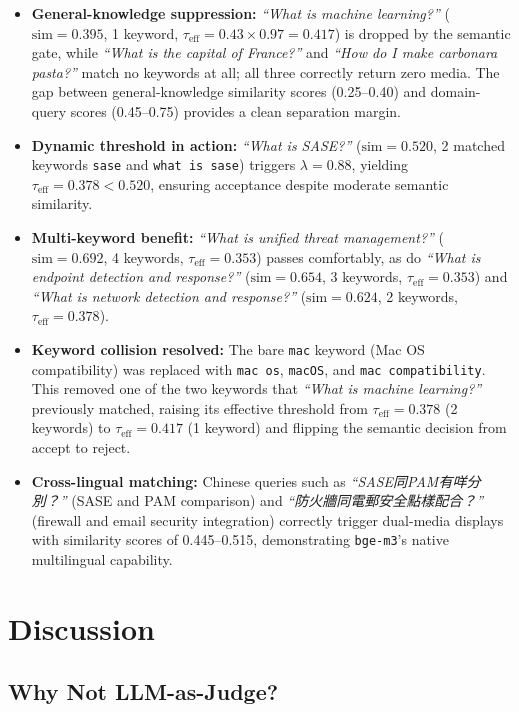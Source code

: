 \documentclass{article}
\begin{document}
\begin{itemize}
  \item \textbf{General-knowledge suppression:} \textit{``What is machine learning?''} ($\text{sim} = 0.395$, 1 keyword, $\tau_{\text{eff}} = 0.43 \times 0.97 = 0.417$) is dropped by the semantic gate, while \textit{``What is the capital of France?''} and \textit{``How do I make carbonara pasta?''} match no keywords at all; all three correctly return zero media. The gap between general-knowledge similarity scores (0.25--0.40) and domain-query scores (0.45--0.75) provides a clean separation margin.
  \item \textbf{Dynamic threshold in action:} \textit{``What is SASE?''} ($\text{sim} = 0.520$, 2 matched keywords \texttt{sase} and \texttt{what is sase}) triggers $\lambda = 0.88$, yielding $\tau_{\text{eff}} = 0.378 < 0.520$, ensuring acceptance despite moderate semantic similarity.
  \item \textbf{Multi-keyword benefit:} \textit{``What is unified threat management?''} ($\text{sim} = 0.692$, 4 keywords, $\tau_{\text{eff}} = 0.353$) passes comfortably, as do \textit{``What is endpoint detection and response?''} ($\text{sim} = 0.654$, 3 keywords, $\tau_{\text{eff}} = 0.353$) and \textit{``What is network detection and response?''} ($\text{sim} = 0.624$, 2 keywords, $\tau_{\text{eff}} = 0.378$).
  \item \textbf{Keyword collision resolved:} The bare \texttt{mac} keyword (Mac OS compatibility) was replaced with \texttt{mac os}, \texttt{macOS}, and \texttt{mac compatibility}. This removed one of the two keywords that \textit{``What is machine learning?''} previously matched, raising its effective threshold from $\tau_{\text{eff}} = 0.378$ (2 keywords) to $\tau_{\text{eff}} = 0.417$ (1 keyword) and flipping the semantic decision from accept to reject.
  \item \textbf{Cross-lingual matching:} Chinese queries such as \textit{``SASE同PAM有咩分別？''} (SASE and PAM comparison) and \textit{``防火牆同電郵安全點樣配合？''} (firewall and email security integration) correctly trigger dual-media displays with similarity scores of 0.445--0.515, demonstrating \texttt{bge-m3}'s native multilingual capability.
\end{itemize}

\section{Discussion}

\subsection{Why Not LLM-as-Judge?}
\end{document}
